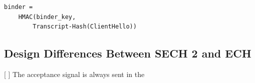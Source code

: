 \begin{listing}
    \begin{verbatim}
binder =
    HMAC(binder_key,
        Transcript-Hash(ClientHello))
    \end{verbatim}
    \captionsetup{width=.8\linewidth} 
    \caption{\label{lst:binder-sech2-pseudocode-ext}Calculation of  for SECH 2 bootstrap \acp{PSK}.}
\end{listing}


\subsection{Design Differences Between SECH 2 and ECH}
[ ] The acceptance signal is always sent in the 

